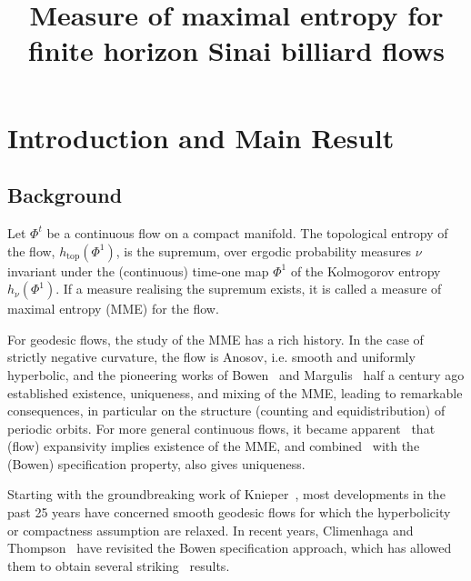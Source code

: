 \documentclass[AHL,Unicode,longabstracts,published]{cedram}
\title{Measure of maximal entropy for finite horizon Sinai billiard flows}
\author{\firstname{Viviane} \lastname{Baladi}}
\author{\firstname{Jérôme} \lastname{Carrand}}
\author{\firstname{Mark F.} \lastname{Demers}}
\newcommand{\htop}{h_{\scriptstyle{\text{top}}}}
\newcommand{\htop}{h_{\scriptstyle{\text{top}}}}
\begin{document}
\maketitle

\section{Introduction and Main Result}


\subsection{Background}

Let $\Phi^t$ be a continuous flow on a compact manifold. The topological entropy of the flow, $\htop(\Phi^1)$, is the supremum, over ergodic probability measures $\nu$ invariant under the (continuous) time-one map $\Phi^1$ of the Kolmogorov entropy $h_\nu(\Phi ^1)$. If a measure realising the supremum exists, it is called a measure of maximal entropy (MME) for the flow.


For geodesic flows, the study of the MME has a rich history. In the case of strictly negative curvature, the flow is Anosov, i.e. smooth and uniformly hyperbolic, and the pioneering works of Bowen~\cite{Bow} and Margulis~\cite{Mar0, Mar} half a century ago established existence, uniqueness, and mixing of the MME, leading to remarkable consequences, in particular on the structure (counting and equidistribution) of periodic orbits. For more general continuous flows, it became apparent~\cite{Bo0, Bo1, BW} that (flow) expansivity implies existence of the MME, and combined~\cite{Fr} with the (Bowen) specification property, also gives uniqueness.

Starting with the groundbreaking work of Knieper~\cite{Kn}, most developments in the past 25 years have concerned smooth geodesic flows for which the hyperbolicity or compactness assumption are relaxed. In recent years, Climenhaga and Thompson~\cite{CT} have revisited the Bowen specification approach, which has allowed them to obtain several striking~\cite{BCFT,CKW} results.
\end{document}
